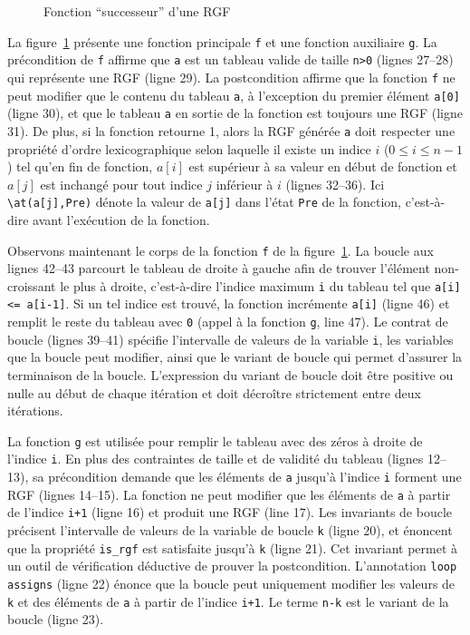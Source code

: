 \begin{figure}[tb]
  \centering
  
  \caption{Fonction ``successeur'' d'une RGF \label{fig:rgf1}}
\end{figure}


La figure~\ref{fig:rgf1} présente une fonction principale \lstinline{f} et une
fonction auxiliaire \lstinline{g}.
La précondition de \lstinline{f} affirme que \lstinline{a} est un tableau
valide de taille \lstinline{n>0} (lignes 27--28) qui représente une RGF
(ligne 29).
La postcondition affirme que la fonction \lstinline'f' ne peut modifier que le
contenu du tableau \lstinline{a}, à l'exception du premier élément
\lstinline{a[0]} (ligne 30), et que le tableau \lstinline{a} en sortie de la
fonction est toujours une RGF (ligne 31).
De plus, si la fonction retourne 1, alors la RGF générée \lstinline{a} doit
respecter une propriété d'ordre lexicographique selon laquelle
il existe un indice $i$ ($0 \le i \le n-1$) tel qu'en fin de fonction, $a[i]$
est supérieur à sa valeur en début de fonction et $a[j]$ est inchangé pour tout
indice $j$ inférieur à $i$ (lignes 32--36).
Ici \lstinline{\at(a[j],Pre)} dénote la valeur de \lstinline{a[j]} dans l'état 
\lstinline{Pre} de la fonction, c'est-à-dire avant l'exécution de la fonction.

Observons maintenant le corps de la fonction \lstinline{f} de la
figure~\ref{fig:rgf1}. 
La boucle aux lignes 42--43 parcourt le tableau de droite à gauche afin de
trouver l'élément non-croissant le plus à droite, c'est-à-dire l'indice maximum
\lstinline{i} du tableau tel que \lstinline{a[i] <= a[i-1]}.
Si un tel indice est trouvé, la fonction incrémente \lstinline{a[i]} (ligne 46)
et remplit le reste du tableau avec \lstinline{0} (appel à la fonction
\lstinline{g}, line 47).
Le contrat de boucle (lignes 39--41) spécifie l'intervalle de valeurs de la
variable \lstinline'i', les variables que la boucle peut modifier, ainsi que
le variant de boucle qui permet d'assurer la terminaison de la boucle.
L'expression du variant de boucle doit être positive ou nulle au début de chaque
itération et doit décroître strictement entre deux itérations.

La fonction \lstinline{g} est utilisée pour remplir le tableau avec des zéros
à droite de l'indice \lstinline{i}.
En plus des contraintes de taille et de validité du tableau (lignes 12--13),
sa précondition demande que les éléments de \lstinline{a} jusqu'à l'indice
\lstinline{i} forment une RGF (lignes 14--15).
La fonction ne peut modifier que les éléments de \lstinline{a} à partir de
l'indice \lstinline{i+1} (ligne 16) et produit une RGF (line 17).
Les invariants de boucle précisent l'intervalle de valeurs de la variable de
boucle \lstinline{k} (ligne 20), et énoncent que la propriété \lstinline{is_rgf}
est satisfaite jusqu'à \lstinline{k} (ligne 21).
Cet invariant permet à un outil de vérification déductive de prouver la
postcondition.
L'annotation \lstinline{loop assigns} (ligne 22) énonce que la boucle peut
uniquement modifier les valeurs de \lstinline{k} et des éléments de
\lstinline{a} à partir de l'indice \lstinline{i+1}.
Le terme \lstinline{n-k} est le variant de la boucle (ligne 23).

